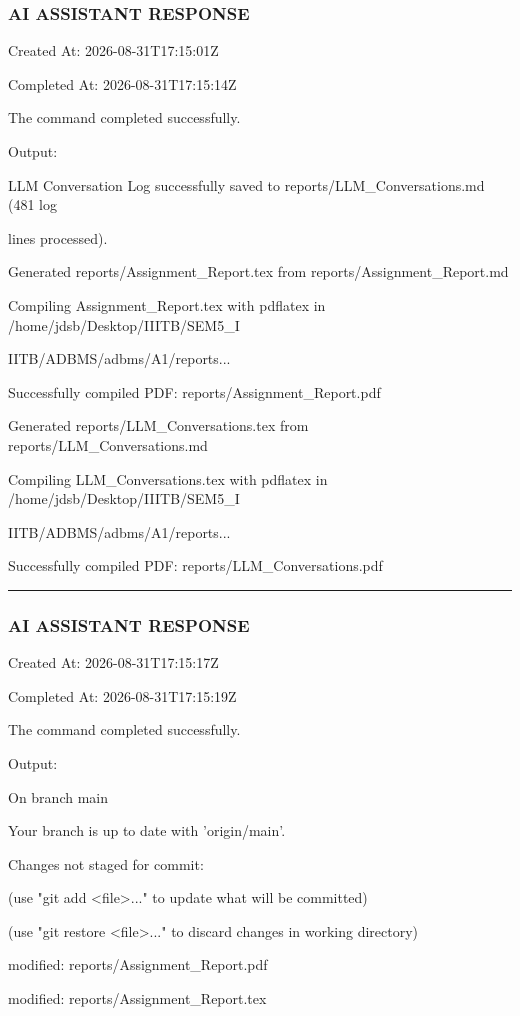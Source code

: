 \documentclass[11pt,a4paper]{article}
\begin{document}
\subsubsection{AI ASSISTANT RESPONSE}

Created At: 2026-08-31T17:15:01Z

Completed At: 2026-08-31T17:15:14Z


The command completed successfully.

Output:

LLM Conversation Log successfully saved to reports/LLM\_Conversations.md (481 log

lines processed).

Generated reports/Assignment\_Report.tex from reports/Assignment\_Report.md

Compiling Assignment\_Report.tex with pdflatex in /home/jdsb/Desktop/IIITB/SEM5\_I

IITB/ADBMS/adbms/A1/reports...

Successfully compiled PDF: reports/Assignment\_Report.pdf

Generated reports/LLM\_Conversations.tex from reports/LLM\_Conversations.md

Compiling LLM\_Conversations.tex with pdflatex in /home/jdsb/Desktop/IIITB/SEM5\_I

IITB/ADBMS/adbms/A1/reports...

Successfully compiled PDF: reports/LLM\_Conversations.pdf


\hrule

\subsubsection{AI ASSISTANT RESPONSE}

Created At: 2026-08-31T17:15:17Z

Completed At: 2026-08-31T17:15:19Z


The command completed successfully.

Output:

On branch main

Your branch is up to date with 'origin/main'.


Changes not staged for commit:

(use "git add <file>..." to update what will be committed)

(use "git restore <file>..." to discard changes in working directory)

modified:   reports/Assignment\_Report.pdf

modified:   reports/Assignment\_Report.tex
\end{document}
